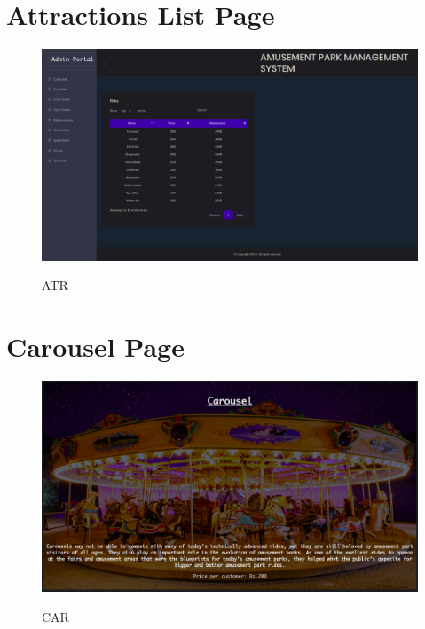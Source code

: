 \section{Attractions List Page}
\begin{figure}[H]
\centering
\caption{ATR}
\includegraphics[scale=.5]{./atr.png}
\\[0.2in]
\label{fig:ER diagram}
\end{figure}

\thispagestyle{fancy}


\section{Carousel Page}
\begin{figure}[H]
\centering
\caption{CAR}
\includegraphics[scale=.5]{./car.png}
\\[0.2in]
\label{fig:ER diagram}
\end{figure}

\thispagestyle{fancy}


